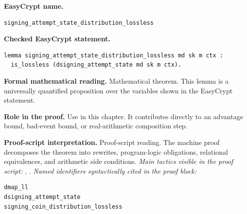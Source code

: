 \begin{formaltheorem}
\noindent\textbf{EasyCrypt name.}
\begin{lstlisting}[language=EasyCrypt,basicstyle=\ttfamily\scriptsize]
signing_attempt_state_distribution_lossless
\end{lstlisting}
\noindent\textbf{Checked EasyCrypt statement.}
\begin{lstlisting}[language=EasyCrypt,basicstyle=\ttfamily\scriptsize]
lemma signing_attempt_state_distribution_lossless md sk m ctx :
  is_lossless (dsigning_attempt_state md sk m ctx).
\end{lstlisting}
\noindent\textbf{Formal mathematical reading.}
Mathematical theorem. This lemma is a universally quantified proposition over the variables shown in the EasyCrypt statement.

\noindent\textbf{Role in the proof.}
Use in this chapter. It contributes directly to an advantage bound, bad-event bound, or real-arithmetic composition step.

\noindent\textbf{Proof-script interpretation.}
Proof-script reading. The machine proof decomposes the theorem into rewrites, program-logic obligations, relational equivalences, and arithmetic side conditions.
\emph{Main tactics visible in the proof script:} , .
\emph{Named identifiers syntactically cited in the proof block:}
\begin{lstlisting}[language=EasyCrypt,basicstyle=\ttfamily\scriptsize]
dmap_ll
dsigning_attempt_state
signing_coin_distribution_lossless
\end{lstlisting}

\end{formaltheorem}

